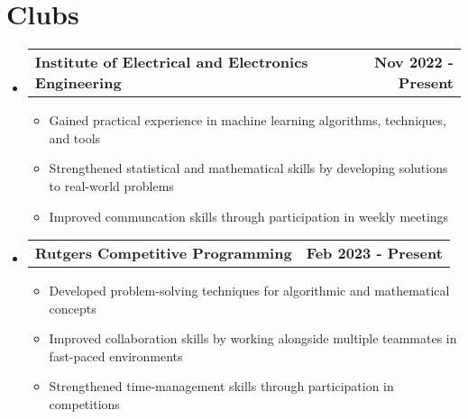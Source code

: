 \documentclass[letterpaper,11pt]{article}
\makeatletter
\newcommand{\resumeItem}[1]{
  \item\small{
    {#1 \vspace{-2pt}}
  }
}
\newcommand{\resumeProjectHeading}[2]{
    \item
    \begin{tabular*}{0.97\textwidth}{l@{\extracolsep{\fill}}r}
      \small#1 & #2 \\
    \end{tabular*}\vspace{-7pt}
}
\newcommand{\resumeSubHeadingListStart}{\begin{itemize}[leftmargin=0.15in, label={}]}
\newcommand{\resumeSubHeadingListEnd}{\end{itemize}}
\newcommand{\resumeItemListStart}{\begin{itemize}}
\newcommand{\resumeItemListEnd}{\end{itemize}\vspace{-3pt}}
\makeatother
\begin{document}
\section{Clubs}
    \resumeSubHeadingListStart
      \resumeProjectHeading
          {\textbf{Institute of Electrical and Electronics Engineering}}{\textbf{Nov 2022 - Present}}
          \resumeItemListStart
            \resumeItem{Gained practical experience in machine learning algorithms, techniques, and tools}
            \resumeItem{Strengthened statistical and mathematical skills by developing solutions to real-world problems}
            \resumeItem{Improved communcation skills through participation in weekly meetings}
          \resumeItemListEnd
      \resumeProjectHeading
          {\textbf{Rutgers Competitive Programming}}{\textbf{Feb 2023 - Present}}
          \resumeItemListStart
            \resumeItem{Developed problem-solving techniques for algorithmic and mathematical concepts}
            \resumeItem{Improved collaboration skills by working alongside multiple teammates in fast-paced environments}
            \resumeItem{Strengthened time-management skills through participation in competitions}
        \resumeItemListEnd
    \resumeSubHeadingListEnd


\end{document}
